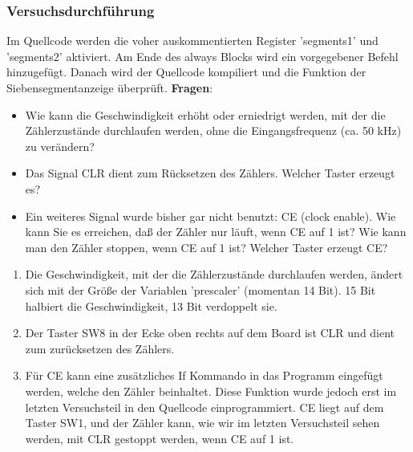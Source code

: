 \documentclass[12pt,a4paper]{article}
\begin{document}
\subsubsection*{Versuchsdurchführung}
Im Quellcode werden die voher auskommentierten Register 'segments1' und 'segments2' aktiviert. Am Ende des always Blocks wird ein vorgegebener Befehl hinzugefügt. Danach wird der Quellcode kompiliert und die Funktion der Siebensegmentanzeige überprüft.
\textbf{Fragen}:
\begin{itemize}
\item Wie kann die Geschwindigkeit erhöht oder erniedrigt werden, mit der die Zählerzustände durchlaufen werden, ohne die Eingangsfrequenz (ca. 50 kHz) zu verändern?
\item Das Signal CLR dient zum Rücksetzen des Zählers. Welcher Taster erzeugt es?
\item Ein weiteres Signal wurde bisher gar nicht benutzt: CE (clock enable). Wie kann Sie es erreichen, daß der Zähler nur läuft, wenn CE auf 1 ist? Wie kann man den Zähler stoppen, wenn CE auf 1 ist? Welcher Taster erzeugt CE?
\end{itemize} 
\begin{enumerate}
\item Die Geschwindigkeit, mit der die Zählerzustände durchlaufen werden, ändert sich mit der Größe der Variablen 'prescaler' (momentan 14 Bit). 15 Bit halbiert die Geschwindigkeit, 13 Bit verdoppelt sie.
\item Der Taster SW8 in der Ecke oben rechts auf dem Board ist CLR und dient zum zurücksetzen des Zählers.
\item Für CE kann eine zusätzliches If Kommando in das Programm eingefügt werden, welche den Zähler beinhaltet. Diese Funktion wurde jedoch erst im letzten Versuchsteil in den Quellcode einprogrammiert. CE liegt auf dem Taster SW1, und der Zähler kann, wie wir im letzten Versuchsteil sehen werden, mit CLR gestoppt werden, wenn CE auf 1 ist.
\end{enumerate}
\end{document}
